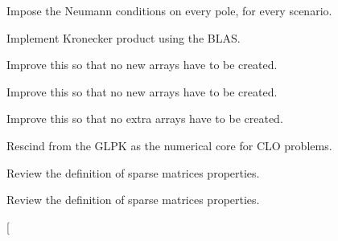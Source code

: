 
\begin{DoxyRefList}
\item[\label{todo__todo000012}%
\hypertarget{todo__todo000012}{}%
Member \hyperlink{classmtk_1_1BCDescriptor2D_acba15639218e80fd93aff482b185201e}{mtk\+:\+:B\+C\+Descriptor2\+D\+:\+:Impose\+On\+South\+Boundary} (const \hyperlink{classmtk_1_1UniStgGrid2D}{mtk\+::\+Uni\+Stg\+Grid2\+D} \&grid, \hyperlink{classmtk_1_1DenseMatrix}{mtk\+::\+Dense\+Matrix} \&matrix, const int \&order\+\_\+accuracy) const ]Impose the Neumann conditions on every pole, for every scenario.  
\item[\label{todo__todo000001}%
\hypertarget{todo__todo000001}{}%
Member \hyperlink{classmtk_1_1DenseMatrix_a01d3d8bd502870f93bf3a88a0cc5fb49}{mtk\+:\+:Dense\+Matrix\+:\+:Kron} (const Dense\+Matrix \&aa, const Dense\+Matrix \&bb)]Implement Kronecker product using the B\+L\+A\+S.  
\item[\label{todo__todo000015}%
\hypertarget{todo__todo000015}{}%
Member \hyperlink{classmtk_1_1DenseMatrix_a59b9bea24acf39dca64e8549b3527463}{mtk\+:\+:Dense\+Matrix\+:\+:Order\+Col\+Major} ()]Improve this so that no new arrays have to be created.  
\item[\label{todo__todo000014}%
\hypertarget{todo__todo000014}{}%
Member \hyperlink{classmtk_1_1DenseMatrix_ac2949efba3e8278335d45418c85433e4}{mtk\+:\+:Dense\+Matrix\+:\+:Order\+Row\+Major} ()]Improve this so that no new arrays have to be created.  
\item[\label{todo__todo000013}%
\hypertarget{todo__todo000013}{}%
Member \hyperlink{classmtk_1_1DenseMatrix_a71d9c07ca66e88d97d1fd5012f43138b}{mtk\+:\+:Dense\+Matrix\+:\+:Transpose} ()]Improve this so that no extra arrays have to be created.  
\item[\label{todo__todo000002}%
\hypertarget{todo__todo000002}{}%
Class \hyperlink{classmtk_1_1GLPKAdapter}{mtk\+:\+:G\+L\+P\+K\+Adapter} ]Rescind from the G\+L\+P\+K as the numerical core for C\+L\+O problems.  
\item[\label{todo__todo000022}%
\hypertarget{todo__todo000022}{}%
Member \hyperlink{classmtk_1_1Matrix_af4bba5c43d1f09f5059a04298ba24568}{mtk\+:\+:Matrix\+:\+:Increase\+Num\+Null} () noexcept]Review the definition of sparse matrices properties.  
\item[\label{todo__todo000021}%
\hypertarget{todo__todo000021}{}%
Member \hyperlink{classmtk_1_1Matrix_ace7cb5c31d0de66b8f9c63cd542c9e63}{mtk\+:\+:Matrix\+:\+:Increase\+Num\+Zero} () noexcept]Review the definition of sparse matrices properties.  
\item[\label{todo__todo000023}%

\end{DoxyRefList}
